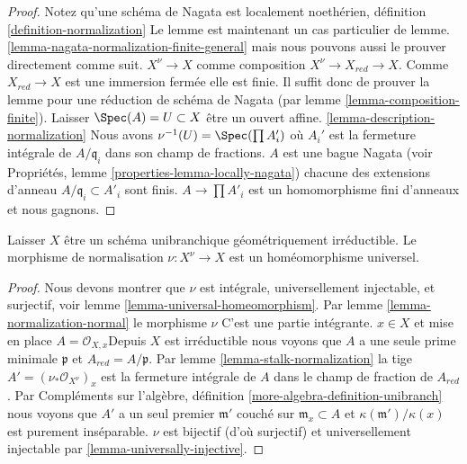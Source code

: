 \begin{proof}

Notez qu'une schéma de Nagata est localement noethérien, définition \ref{definition-normalization}
Le lemme est maintenant un cas particulier de lemme. \ref{lemma-nagata-normalization-finite-general}
mais nous pouvons aussi le prouver directement comme suit. $X^\nu \to X$ comme composition
$X^\nu \to X_{red} \to X$. Comme $X_{red} \to X$ est une immersion fermée elle est finie. Il suffit donc de prouver la lemme pour une réduction de schéma de Nagata (par lemme \ref{lemma-composition-finite}). Laisser $\Spec(A) = U \subset X$ être un ouvert affine. \ref{lemma-description-normalization} Nous avons
$\nu^{-1}(U) = \Spec(\prod A_i')$ où $A_i'$ est la fermeture intégrale de $A/\mathfrak q_i$ dans son champ de fractions. $A$ est une bague Nagata (voir Propriétés, lemme \ref{properties-lemma-locally-nagata}) chacune des extensions d'anneau
$A/\mathfrak q_i \subset A'_i$ sont finis. $A \to \prod A'_i$
est un homomorphisme fini d'anneaux et nous gagnons.

\end{proof}

\begin{lemma}

\label{lemma-normalization-geom-unibranch-univ-homeo}

Laisser $X$ être un schéma unibranchique géométriquement irréductible. Le morphisme de normalisation $\nu : X^\nu \to X$ est un homéomorphisme universel.

\end{lemma}

\begin{proof}

Nous devons montrer que $\nu$ est intégrale, universellement injectable, et surjectif, voir lemme \ref{lemma-universal-homeomorphism}. Par lemme \ref{lemma-normalization-normal} le morphisme $\nu$
C'est une partie intégrante. $x \in X$ et mise en place $A = \mathcal{O}_{X, x}$Depuis $X$ est irréductible nous voyons que $A$ a une seule prime minimale $\mathfrak p$ et $A_{red} = A/\mathfrak p$. Par lemme \ref{lemma-stalk-normalization} la tige
$A' = (\nu_*\mathcal{O}_{X^\nu})_x$ est la fermeture intégrale de
$A$ dans le champ de fraction de $A_{red}$. Par Compléments sur l'algèbre, définition \ref{more-algebra-definition-unibranch}
nous voyons que $A'$ a un seul premier $\mathfrak m'$ couché sur $\mathfrak m_x \subset A$ et $\kappa(\mathfrak m')/\kappa(x)$
est purement inséparable. $\nu$ est bijectif (d'où surjectif) et universellement injectable par \ref{lemma-universally-injective}.

\end{proof}







